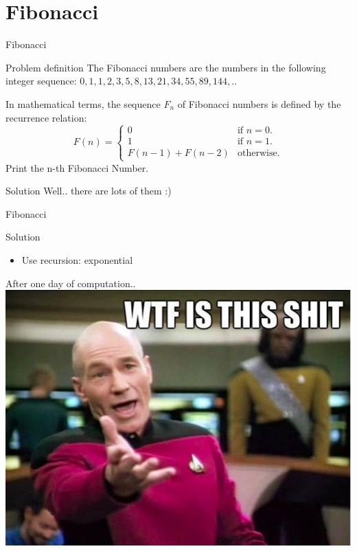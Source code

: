 \documentclass{beamer}
\begin{document}
  \section{Fibonacci}
  \begin{frame}{Fibonacci}
    \begin{block}{Problem definition}
        The Fibonacci numbers are the numbers in the following integer sequence: \newline
        $0, 1, 1, 2, 3, 5, 8, 13, 21, 34, 55, 89, 144, ..$

        In mathematical terms, the sequence $F_n$ of Fibonacci numbers is defined by the recurrence relation: \newline
        \begin{equation}
            F(n)=\begin{cases}
            0 & \text{if $n=0$}.\\
            1 & \text{if $n=1$}. \\
            F(n-1) + F(n-2) & \text{otherwise}.
            \end{cases}
        \end{equation}
        \newline
        Print the n-th Fibonacci Number.
    \end{block}
    \pause
    \begin{block}{Solution}
    Well.. there are lots of them :)
    \end{block}
  \end{frame}
  
  \begin{frame}{Fibonacci}
    \begin{block}{Solution}
        \begin{itemize}
            \item Use recursion: exponential
        \end{itemize}
    \end{block}
    \pause
    \begin{center}
        After one day of computation..
        \includegraphics[scale=0.35]{shit}
    \end{center}
  \end{frame}
  
\end{document}
